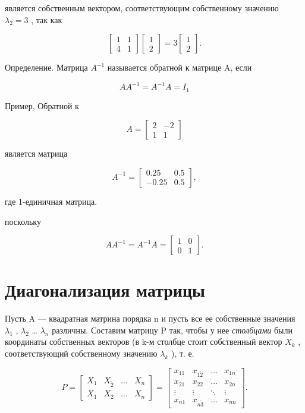 \documentclass[
  ukrainian,
]{article}
\begin{document}
является собственным вектором, соответствующим собственному значению
\(\lambda_2 = 3\) , так как

\[
\begin{bmatrix} 1 & 1 \\ 4 & 1 \end{bmatrix} \begin{bmatrix} 1 \\ 2 \end{bmatrix} = 3 \begin{bmatrix} 1 \\ 2 \end{bmatrix}.
\]

Определение. Матрица \(A^{-1}\) называется обратной к матрице A, если

\[
AA^{-1} = A^{-1}A = I_1
\]

Пример, Обратной к

\[
A = \begin{bmatrix} 2 & -2 \\ 1 & 1 \end{bmatrix}
\]

является матрица

\[
A^{-1} = \begin{bmatrix} 0.25 & 0.5 \\ -0.25 & 0.5 \end{bmatrix},
\]

где 1-единичная матрица.

поскольку

\[
AA^{-1} = A^{-1}A = \begin{bmatrix} 1 & 0 \\ 0 & 1 \end{bmatrix}.
\]

\section{Диагонализация
матрицы}\label{ux434ux438ux430ux433ux43eux43dux430ux43bux438ux437ux430ux446ux438ux44f-ux43cux430ux442ux440ux438ux446ux44b}

Пусть A --- квадратная матрина порядка n и пусть все ее собственные
значения \(\lambda_1\) , \(\lambda_2\) \ldots{} \(\lambda_n\) различны.
Составим матрицу P так, чтобы у нее \emph{столбцами} были координаты
собственных векторов (в k-м столбце стоит собственный вектор \(X_k\) ,
соответствующий собственному значению \(\lambda_k\) ), т. е.

\[
P = \begin{bmatrix} X_1 & X_{\tilde{2}} & \dots & X_n \\ X_{1} & X_{2} & \dots & X_n \end{bmatrix} = \begin{bmatrix} x_{11} & x_{1\tilde{2}} & \dots & x_{1n} \\ x_{21} & x_{22} & \dots & x_{2n} \\ \vdots & \vdots & \ddots & \vdots \\ x_{n1} & x_{n\tilde{3}} & \dots & x_{nn} \end{bmatrix}.
\]
\end{document}

